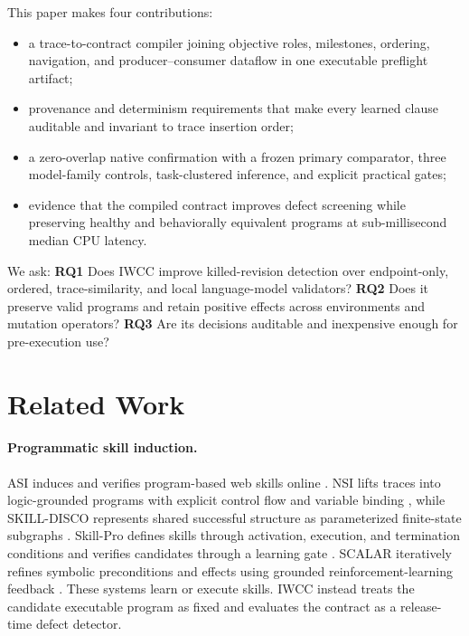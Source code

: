\documentclass[10pt]{article}
\begin{document}
This paper makes four contributions:
\begin{itemize}
  \item a trace-to-contract compiler joining objective roles, milestones, ordering, navigation, and producer--consumer dataflow in one executable preflight artifact;
  \item provenance and determinism requirements that make every learned clause auditable and invariant to trace insertion order;
  \item a zero-overlap native confirmation with a frozen primary comparator, three model-family controls, task-clustered inference, and explicit practical gates;
  \item evidence that the compiled contract improves defect screening while preserving healthy and behaviorally equivalent programs at sub-millisecond median CPU latency.
\end{itemize}

We ask: \textbf{RQ1} Does IWCC improve killed-revision detection over endpoint-only, ordered, trace-similarity, and local language-model validators? \textbf{RQ2} Does it preserve valid programs and retain positive effects across environments and mutation operators? \textbf{RQ3} Are its decisions auditable and inexpensive enough for pre-execution use?

\section{Related Work}
\paragraph{Programmatic skill induction.}
ASI induces and verifies program-based web skills online \citep{wang2025asi}. NSI lifts traces into logic-grounded programs with explicit control flow and variable binding \citep{shao2026nsi}, while SKILL-DISCO represents shared successful structure as parameterized finite-state subgraphs \citep{guo2026skilldisco}. Skill-Pro defines skills through activation, execution, and termination conditions and verifies candidates through a learning gate \citep{mi2026skillpro}. SCALAR iteratively refines symbolic preconditions and effects using grounded reinforcement-learning feedback \citep{zabounidis2026scalar}. These systems learn or execute skills. IWCC instead treats the candidate executable program as fixed and evaluates the contract as a release-time defect detector.
\end{document}

